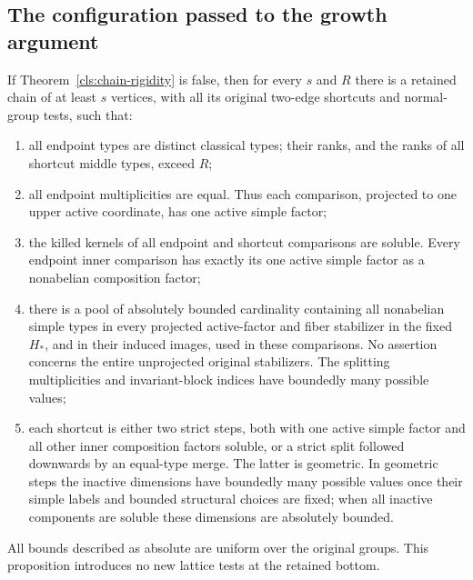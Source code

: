 \subsection{The configuration passed to the growth argument}

\begin{proposition}
\label{cls:reduction}
If Theorem~\ref{cls:chain-rigidity} is false, then for every $s$ and
$R$ there is a retained chain of at least $s$ vertices, with all its
original two-edge shortcuts and normal-group tests, such that:
\begin{enumerate}[label=\textup{(\roman*)}]
\item all endpoint types are distinct classical types; their ranks,
and the ranks of all shortcut middle types, exceed $R$;
\item all endpoint multiplicities are equal.  Thus each comparison,
projected to one upper active coordinate, has one active simple
factor;
\item the killed kernels of all endpoint and shortcut comparisons
are soluble.  Every endpoint inner comparison has exactly its one
active simple factor as a nonabelian composition factor;
\item there is a pool of absolutely bounded cardinality containing
all nonabelian simple types in every projected active-factor and fiber
stabilizer in the fixed $H_*$, and in their induced images, used in
these comparisons.  No assertion concerns the entire unprojected
original stabilizers.  The splitting multiplicities
and invariant-block indices have boundedly many possible values;
\item each shortcut is either two strict steps, both with one
active simple factor and all other inner composition factors
soluble, or a strict split followed downwards by an equal-type
merge.  The latter is geometric.  In geometric steps the inactive
dimensions have boundedly many possible values once their simple
labels and bounded structural choices are fixed; when all inactive
components are soluble these dimensions are absolutely bounded.
\end{enumerate}
All bounds described as absolute are uniform over the original
groups.  This proposition introduces no new lattice tests at the
retained bottom.
\end{proposition}
